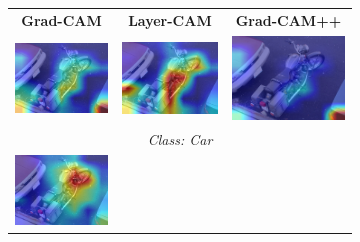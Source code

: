 \begin{figure}[!t]
  \centering
  \setlength{\tabcolsep}{1pt}
  \renewcommand{\arraystretch}{0.7}

  \begin{subfigure}[t]{0.48\textwidth}
    \centering
    \begin{tabular}{c c c}
      {\scriptsize \textbf{Grad-CAM}} & {\scriptsize \textbf{Layer-CAM}} & {\scriptsize \textbf{Grad-CAM++}} \\[2pt]
      \includegraphics[width=0.28\linewidth, height=0.28\linewidth]{figures/cams/gradcam/2008_007558_6} &
      \includegraphics[width=0.28\linewidth, height=0.28\linewidth]{figures/cams/layercam/2008_007558_6} &
      \includegraphics[width=0.28\linewidth, height=0.28\linewidth]{figures/cams/gradcampp/2008_007558_6} \\
      \multicolumn{3}{c}{{\scriptsize \textit{Class: Car}}} \\[2pt]
      \includegraphics[width=0.28\linewidth, height=0.28\linewidth]{figures/cams/gradcam/2008_007558_13} &

\end{tabular}
\end{subfigure}
\end{figure}

